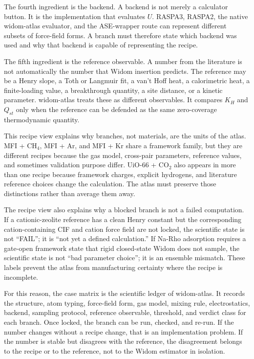 The fourth ingredient is the backend. A backend is not merely a calculator button. It is the implementation that evaluates \(U\). RASPA3, RASPA2, the native widom-atlas evaluator, and the ASE-wrapper route can represent different subsets of force-field forms. A branch must therefore state which backend was used and why that backend is capable of representing the recipe.

The fifth ingredient is the reference observable. A number from the literature is not automatically the number that Widom insertion predicts. The reference may be a Henry slope, a Toth or Langmuir fit, a van't Hoff heat, a calorimetric heat, a finite-loading value, a breakthrough quantity, a site distance, or a kinetic parameter. widom-atlas treats these as different observables. It compares \(K_H\) and \(Q_{st}\) only when the reference can be defended as the same zero-coverage thermodynamic quantity.

This recipe view explains why branches, not materials, are the units of the atlas. MFI + CH\(_4\), MFI + Ar, and MFI + Kr share a framework family, but they are different recipes because the gas model, cross-pair parameters, reference values, and sometimes validation purpose differ. UiO-66 + CO\(_2\) also appears in more than one recipe because framework charges, explicit hydrogens, and literature reference choices change the calculation. The atlas must preserve those distinctions rather than average them away.

The recipe view also explains why a blocked branch is not a failed computation. If a cationic-zeolite reference has a clean Henry constant but the corresponding cation-containing CIF and cation force field are not locked, the scientific state is not ``FAIL''; it is ``not yet a defined calculation.'' If Na-Rho adsorption requires a gate-open framework state that rigid closed-state Widom does not sample, the scientific state is not ``bad parameter choice''; it is an ensemble mismatch. These labels prevent the atlas from manufacturing certainty where the recipe is incomplete.

For this reason, the case matrix is the scientific ledger of widom-atlas. It records the structure, atom typing, force-field form, gas model, mixing rule, electrostatics, backend, sampling protocol, reference observable, threshold, and verdict class for each branch. Once locked, the branch can be run, checked, and re-run. If the number changes without a recipe change, that is an implementation problem. If the number is stable but disagrees with the reference, the disagreement belongs to the recipe or to the reference, not to the Widom estimator in isolation.

